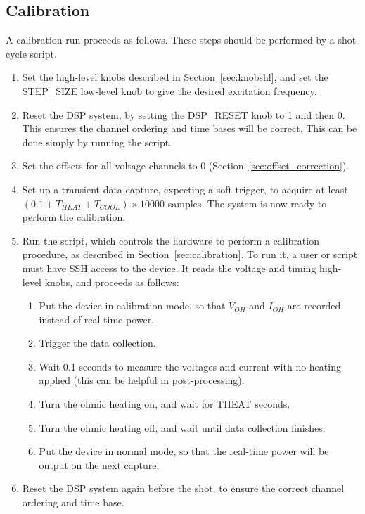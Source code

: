 \documentclass[12pt,a4paper]{article}
\begin{document}
\subsection{Calibration}
\label{sec:run_calibration}
A calibration run proceeds as follows. These steps should be performed by a shot-cycle script.
\begin{enumerate}
\item{Set the high-level knobs described in Section~\ref{sec:knobshl}, and set the STEP{\_}SIZE low-level knob to give the desired excitation
    frequency.}
\item{Reset the DSP system, by setting the DSP{\_}RESET knob to 1 and then 0. This ensures the channel ordering and time bases will be
    correct. This can be done simply by running the \mbox{} script.}
\item{Set the offsets for all voltage channels to 0 (Section~\ref{sec:offset_correction})}.
\item{Set up a transient data capture, expecting a soft trigger, to acquire at least $(0.1 + T_{HEAT} + T_{COOL})\times 10000$ samples. The system is now
    ready to perform the calibration.}
\item{Run the  script, which controls the hardware to perform a calibration procedure, as described in
    Section~\ref{sec:calibration}. To run it, a user or script must have SSH access to the device. It reads the voltage and timing high-level knobs, and
    proceeds as follows:
\begin{enumerate}
\item{Put the device in calibration mode, so that $V_{OH}$ and $I_{OH}$ are recorded, instead of real-time power.}
\item{Trigger the data collection.}
\item{Wait 0.1 seconds to measure the voltages and current with no heating applied (this can be helpful in post-processing).}
\item{Turn the ohmic heating on, and wait for THEAT seconds}.
\item{Turn the ohmic heating off, and wait until data collection finishes.}
\item{Put the device in normal mode, so that the real-time power will be output on the next capture.}
\end{enumerate}
}
\item{Reset the DSP system again before the shot, to ensure the correct channel ordering and time base.}
\end{enumerate}
\end{document}
